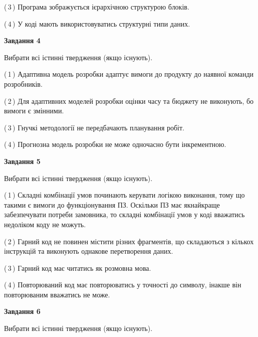 \documentclass[10pt, ukrainian]{article}
\begin{document}
{\begin {large}
(\,3\,) Програма зображується ієрархічною структурою блоків.%



(\,4\,) У коді мають використовуватись структурні типи даних. %


{\begin {center}\textbf{Завдання 4}\end {center}}\par
Вибрати всі істинні твердження (якщо існують).\par
\vspace{2mm}



(\,1\,) Адаптивна модель розробки адаптує вимоги до продукту до наявної команди розробників. %



(\,2\,) Для адаптивних моделей розробки оцінки часу та бюджету не виконують, бо вимоги є змінними. %



(\,3\,) Гнучкі методології не передбачають планування робіт. %



(\,4\,) Прогнозна модель розробки не може одночасно бути інкрементною. %


{\begin {center}\textbf{Завдання 5}\end {center}}\par
Вибрати всі істинні твердження (якщо існують).\par
\vspace{2mm}



(\,1\,) Складні комбінації умов починають керувати логікою виконання, тому що такими є вимоги до функціонування ПЗ. Оскільки ПЗ має якнайкраще забезпечувати потреби замовника, то складні комбінації умов у коді вважатись недоліком коду не можуть. %



(\,2\,) Гарний код не повинен містити різних фрагментів, що складаються з кількох інструкцій та виконують однакове перетворення даних. %



(\,3\,) Гарний код має читатись як розмовна мова. %



(\,4\,) Повторюваний код має повторюватись у точності до символу, інакше він повторюваним вважатись не може. %

\newpage

{\begin {center}\textbf{Завдання 6}\end {center}}\par
Вибрати всі істинні твердження (якщо існують).\par
\vspace{2mm}




\end{large}}
\end{document}
